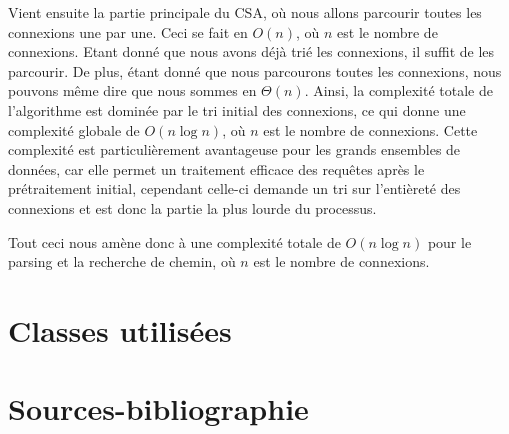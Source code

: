 \documentclass[12pt]{article}
\begin{document}
Vient ensuite la partie principale du CSA, où nous allons parcourir toutes les connexions une par une.
Ceci se fait en $O(n)$, où $n$ est le nombre de connexions. Etant donné que nous avons déjà trié les connexions, il suffit de les parcourir. 
De plus, étant donné que nous parcourons toutes les connexions, nous pouvons même dire que nous sommes en $\Theta(n)$.
Ainsi, la complexité totale de l'algorithme est dominée par le tri initial des connexions, ce qui donne une complexité globale de $O(n \log n)$, où $n$ 
est le nombre de connexions. Cette complexité est particulièrement avantageuse pour les grands ensembles de données, car elle permet un traitement efficace 
des requêtes après le prétraitement initial, cependant celle-ci demande un tri sur l'entièreté des connexions et est donc la partie la plus lourde du processus.

Tout ceci nous amène donc à une complexité totale de $O(n \log n)$ pour le parsing et la recherche de chemin, où $n$ est le nombre de connexions.

\section{Classes utilisées}

\section{Sources-bibliographie}
\cite{dibbelt2017connection} 
\cite{butts2020raptor}
\cite{epfl2024cs108}
\cite{transnetlabCSA}
\cite{gtfsReference}
\cite{futura2009distance}
\cite{geeko2018distance}
\cite{geeksforgeeks_haversine}
\cite{wikipedia_geohash}
\cite{mattaparthi2024ballkd}
\cite{fieldsend_onlineballtree}
\cite{woltmann2025astar}
\cite{wikipedia_astar}
\cite{geeksforgeeks_astar}
\cite{wikipedia_dijkstra}

\printbibliography
\end{document}
